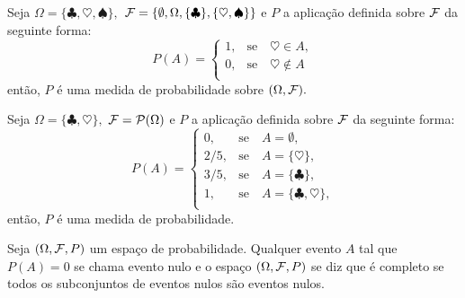 \begin{frame}
 \begin{exem}
 Seja $\Omega=\{ \clubsuit,  \heartsuit, \spadesuit \},$ ${\cal F}= \{ \emptyset, \Omega, \{ \clubsuit \}, \{  \heartsuit, \spadesuit \}    \}$ e $P$ a aplicação
definida sobre ${\cal F}$ da seguinte forma: 
\begin{equation}
\label{medp1}
P(A)=
\begin{cases}
 1, & \text{se} \quad \heartsuit \in A, \\
0, & \text{se} \quad \heartsuit \notin A \\
\end{cases}
\end{equation}
então, $P$ é uma medida de probabilidade sobre $(\Omega, {\cal F}).$
\end{exem}

\begin{exem}
 Seja $\Omega=\{ \clubsuit,  \heartsuit   \},$ ${\cal F}=\mathcal{P}(\Omega )$ e $P$ a aplicação
definida sobre ${\cal F}$ da seguinte forma: 
\begin{equation}
\label{medp2}
P(A)=
\begin{cases}
 0, & \text{se} \quad A =\emptyset, \\
2/5, & \text{se} \quad A =\{\heartsuit\}, \\
3/5, & \text{se} \quad A =\{\clubsuit\}, \\
1, & \text{se} \quad A =\{\clubsuit,  \heartsuit\}, \\
\end{cases}
\end{equation}
então, $P$ é uma medida de probabilidade.
\end{exem}

\begin{defi}
Seja $(\Omega, {\cal F}, P)$ um espaço de probabilidade. Qualquer evento $A$ tal
que $P(A)=0$ se chama evento nulo e o espaço $(\Omega, {\cal F}, P)$ se diz que é completo se
todos os subconjuntos de eventos nulos são eventos nulos.
\end{defi}

\end{frame}
% 

